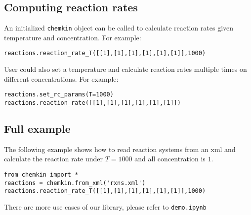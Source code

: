 \documentclass[12pt]{article}
\begin{document}
\subsection{Computing reaction rates}

An initialized {\tt chemkin} object can be called to calculate reaction rates given temperature and concentration. For example:

\begin{lstlisting}
reactions.reaction_rate_T([[1],[1],[1],[1],[1],[1]],1000)
\end{lstlisting}

User could also set a temperature and calculate reaction rates multiple times on different concentrations. For example: 

\begin{lstlisting}
reactions.set_rc_params(T=1000)
reactions.reaction_rate([[1],[1],[1],[1],[1],[1]])
\end{lstlisting}

\subsection{Full example}

The following example shows how to read reaction systems from an xml and calculate the reaction rate under $T = 1000$ and all concentration is $1$.

\begin{lstlisting}
from chemkin import *
reactions = chemkin.from_xml('rxns.xml')
reactions.reaction_rate_T([[1],[1],[1],[1],[1],[1]],1000)
\end{lstlisting}

There are more use cases of our library, please refer to {\tt demo.ipynb}
\end{document}
